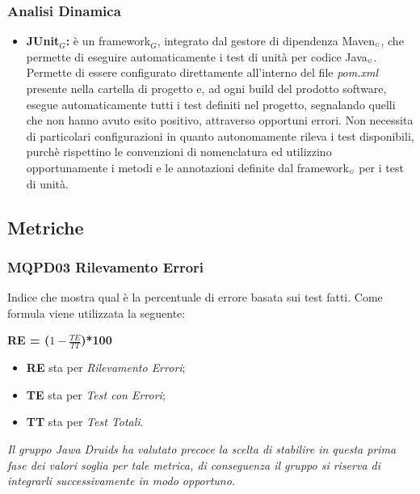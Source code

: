 \subsubsection{Analisi Dinamica} \label{ProcessiDiSupportoVerificaStrumentiAnalisiDinamica}
\begin{itemize}
	\item \textbf{JUnit$_G$:} è un framework$_G$, integrato dal gestore di dipendenza Maven$_{\scaleto{G}{3pt}}$, che permette di eseguire automaticamente i test di unità per codice Java$_{\scaleto{G}{3pt}}$.
	Permette di essere configurato direttamente all’interno del file \textit{pom.xml} presente nella cartella di progetto e, ad ogni build del prodotto software, esegue automaticamente tutti i test definiti nel progetto, segnalando quelli che non hanno avuto esito positivo, attraverso opportuni errori.
	Non necessita di particolari configurazioni in quanto autonomamente rileva i test disponibili, purchè rispettino le convenzioni di nomenclatura ed utilizzino opportunamente i metodi e le annotazioni definite dal framework$_{\scaleto{G}{3pt}}$ per i test di unità.	
\end{itemize}
\subsection{Metriche}\label{ProcessiDiSupportoVerificaMetriche}
\subsubsection{MQPD03 Rilevamento Errori}\label{ProcessiDiSupportoVerificaMetricheMQPD03RilevamentoErrori}
Indice che mostra qual è la percentuale di errore basata sui test fatti.
Come formula viene utilizzata la seguente:
\begin{center}
	\textbf{RE = ($1-\frac{TE}{TT}$)*100}
\end{center}
\begin{itemize}
	\item \textbf{RE} sta per \textit{Rilevamento Errori};
	\item \textbf{TE} sta per \textit{Test con Errori};
	\item \textbf{TT} sta per \textit{Test Totali}.
\end{itemize}
\textit{Il gruppo \textit{Jawa Druids} ha valutato precoce la scelta di stabilire in questa prima fase dei valori soglia per tale metrica, di conseguenza il gruppo si riserva di integrarli successivamente in modo opportuno.}

